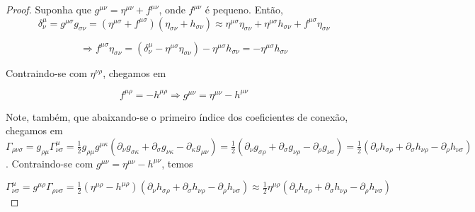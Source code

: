 \begin{proof}
	Suponha que $ g^{\mu \nu}=\eta^{\mu \nu}+f^{\mu \nu} $, onde $ f^{\mu\nu} $ é pequeno. Então,
	 \[\delta_{\nu}^{\mu}=g^{\mu \sigma} g_{\sigma \nu}=\left(\eta^{\mu \sigma}+f^{\mu \sigma}\right)\left(\eta_{\sigma \nu}+h_{\sigma \nu}\right) \approx
	 \eta^{\mu\sigma}\eta_{\sigma\nu}+\eta^{\mu\sigma}h_{\sigma\nu}+f^{\mu\sigma}\eta_{\sigma \nu} \]
	 
	 \[
	 \Rightarrow f^{\mu\sigma}\eta_{\sigma \nu}= (\delta_{\nu}^{\mu} - \eta^{\mu\sigma}\eta_{\sigma\nu})-\eta^{\mu\sigma}h_{\sigma\nu} = -\eta^{\mu\sigma}h_{\sigma\nu}
	 \]
	 
	 Contraindo-se com $ \eta^{\nu \rho} $, chegamos em 
	 
	 \[f^{\mu\rho}=-h^{\mu\rho} \Rightarrow g^{\mu \nu}=\eta^{\mu \nu}-h^{\mu \nu} \]
	 
	 Note, também, que abaixando-se o primeiro índice dos coeficientes de conexão, chegamos em $ \Gamma_{\rho \nu \sigma}=g_{\rho\mu}\Gamma_{\nu \sigma}^\mu=
	 \tfrac{1}{2}g_{\rho\mu}g^{\mu\kappa}(\partial_{\nu}g_{\sigma\kappa}+\partial_{\sigma}g_{\nu\kappa}-\partial_{\kappa}g_{\mu\nu})=
	 \tfrac{1}{2}\left(\partial_{\nu} g_{\sigma \rho}+\partial_{\sigma} g_{\nu \rho}-\partial_{\rho} g_{\nu \sigma}\right)=
	 \tfrac{1}{2}\left(\partial_{\nu} h_{\sigma \rho}+\partial_{\sigma} h_{\nu \rho}-\partial_{\rho} h_{\nu \sigma}\right)$. Contraindo-se com $  g^{\mu \nu}=\eta^{\mu \nu}-h^{\mu \nu} $, temos 
	 
	 \[
	 \Gamma^{\mu}_{\nu\sigma}=
	 g^{\mu\rho}\Gamma_{\rho\nu\sigma}= \tfrac{1}{2}(\eta^{\mu\rho}-h^{\mu\rho})(\partial_{\nu} h_{\sigma \rho}+\partial_{\sigma} h_{\nu \rho}-\partial_{\rho} h_{\nu \sigma})
	 \approx \tfrac{1}{2} \eta^{\mu \rho}\left(\partial_{\nu} h_{\sigma \rho}+\partial_{\sigma} h_{\nu \rho}-\partial_{\rho} h_{\nu \sigma}\right)
	 \]
	 
	 
\end{proof}

